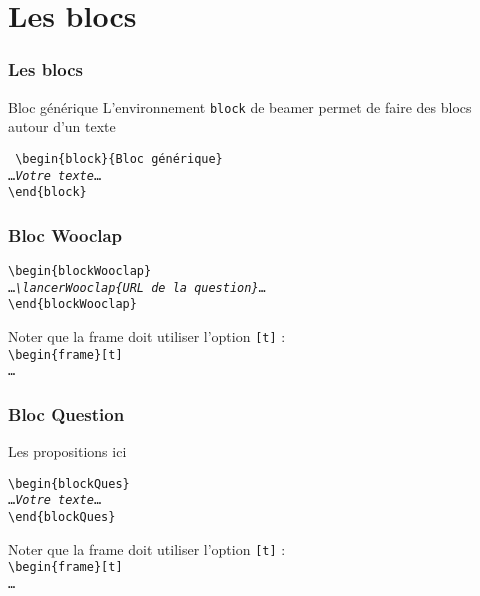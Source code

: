 \documentclass[t,aspectratio=169]{beamer}
\begin{document}
\section{Les blocs}
\begin{frame}
\frametitle{Les \og blocs\fg}
\begin{block}{Bloc générique}
L'environnement \texttt{block} de beamer permet de faire des blocs
autour d'un texte
\end{block}
\noindent\texttt{%
\textbackslash begin\{block\}\{Bloc générique\}\\
\ldots\emph{Votre texte}\ldots\\
\textbackslash end\{block\}
}%
\end{frame}
\begin{frame}[t]
\frametitle{Bloc \og Wooclap\fg}
\begin{blockWooclap}
    \lancerWooclap{}
\end{blockWooclap}
\noindent\texttt{\textbackslash begin\{blockWooclap\}\\
\ldots\emph{\textbackslash lancerWooclap\{URL de la question\}}\ldots\\
\textbackslash end\{blockWooclap\}
}%

Noter que la frame doit utiliser l'option \texttt{[t]} :\\

\noindent\texttt{\textbackslash begin\{frame\}[t]\\ 
    \ldots\\
}%
\end{frame}
\begin{frame}[t]
\frametitle{Bloc \og Question\fg}
\begin{blockQues}
Les propositions ici
\end{blockQues}
\noindent\texttt{\textbackslash begin\{blockQues\}\\
\ldots\emph{Votre texte}\ldots\\
\textbackslash end\{blockQues\}
}%

Noter que la frame doit utiliser l'option \texttt{[t]} :\\

\noindent\texttt{\textbackslash begin\{frame\}[t]\\ 
    \ldots\\
}%
\end{frame}
\end{document}

